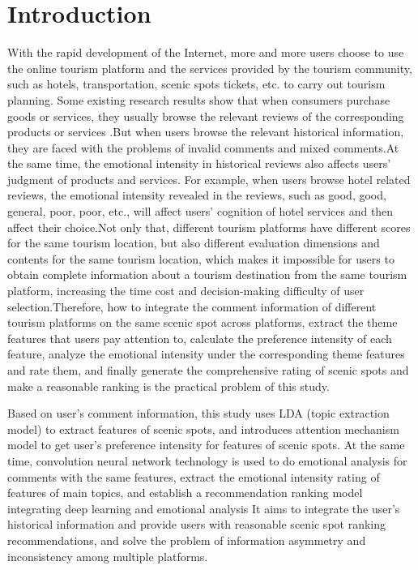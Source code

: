\documentclass[conference]{IEEEtran}
\begin{document}

\section{Introduction}
With the rapid development of the Internet, more and more users choose to use the online tourism platform and the services provided by the tourism community, such as hotels, transportation, scenic spots tickets, etc. to carry out tourism planning. Some existing research results show that when consumers purchase goods or services, they usually browse the relevant reviews of the corresponding products or services \cite{1,2}.But when users browse the relevant historical information, they are faced with the problems of invalid comments and mixed comments.At the same time, the emotional intensity in historical reviews also affects users' judgment of products and services. For example, when users browse hotel related reviews, the emotional intensity revealed in the reviews, such as good, good, general, poor, poor, etc., will affect users' cognition of hotel services and then affect their choice.Not only that, different tourism platforms have different scores for the same tourism location, but also different evaluation dimensions and contents for the same tourism location, which makes it impossible for users to obtain complete information about a tourism destination from the same tourism platform, increasing the time cost and decision-making difficulty of user selection.Therefore, how to integrate the comment information of different tourism platforms on the same scenic spot across platforms, extract the theme features that users pay attention to, calculate the preference intensity of each feature, analyze the emotional intensity under the corresponding theme features and rate them, and finally generate the comprehensive rating of scenic spots and make a reasonable ranking is the practical problem of this study.

Based on user's comment information, this study uses LDA (topic extraction model) to extract features of scenic spots, and introduces attention mechanism model to get user's preference intensity for features of scenic spots. At the same time, convolution neural network technology is used to do emotional analysis for comments with the same features, extract the emotional intensity rating of features of main topics, and establish a recommendation ranking model integrating deep learning and emotional analysis It aims to integrate the user's historical information and provide users with reasonable scenic spot ranking recommendations, and solve the problem of information asymmetry and inconsistency among multiple platforms.
\end{document}
